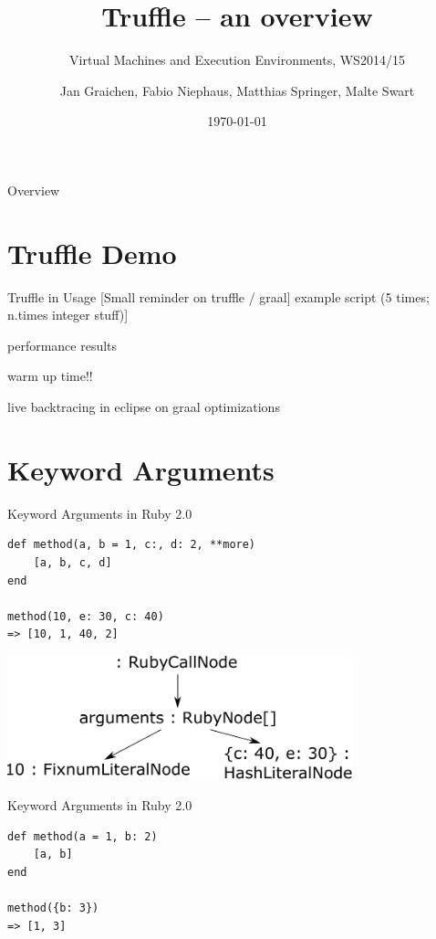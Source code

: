 \documentclass[xcolor=dvipsname,handout]{beamer} %
\title{Truffle -- an overview}
\subtitle{Virtual Machines and Execution Environments, WS2014/15}
\author{Jan Graichen, Fabio Niephaus, Matthias Springer, Malte Swart}
\date{\today}
\institute[2012]{Hasso Plattner Institute, Software Architecture Group}
\begin{document}
\begin{frame}[plain]
	\maketitle
\end{frame}
\begin{frame}{Overview}
	\tableofcontents[hideallsubsections]
\end{frame}

\section{Truffle Demo}

\begin{frame}{Truffle in Usage}
[Small reminder on truffle / graal]
example script (5 times; n.times integer stuff)]

performance results

warm up time!!

live backtracing in eclipse on graal optimizations
\end{frame}

\section{Keyword Arguments}

\begin{frame}[fragile]{Keyword Arguments in Ruby 2.0}
\begin{lstlisting}
def method(a, b = 1, c:, d: 2, **more)
    [a, b, c, d]
end

method(10, e: 30, c: 40)
=> [10, 1, 40, 2]
\end{lstlisting}

\begin{table}
    \centering
    \includegraphics[width=0.75\textwidth]{kwarg_1.pdf}
\end{table}
\end{frame}

\begin{frame}[fragile]{Keyword Arguments in Ruby 2.0}
\begin{lstlisting}
def method(a = 1, b: 2)
    [a, b]
end

method({b: 3})
=> [1, 3]
\end{lstlisting}
\end{frame}
\end{document}
